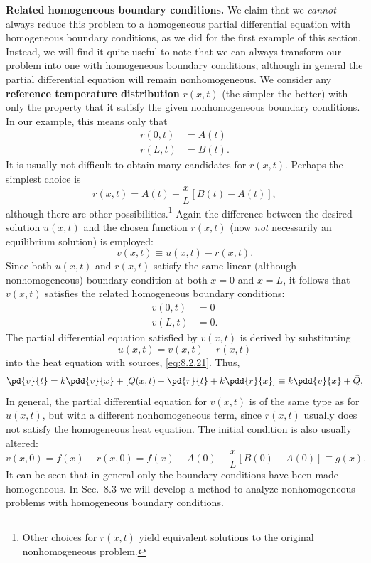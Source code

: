 \textbf{Related homogeneous boundary conditions.}
We claim that we \emph{cannot} always reduce this problem to a homogeneous partial differential equation with homogeneous boundary conditions, as we did for the first example of this section.  Instead, we will find it quite useful to note that we can always transform our problem into one with homogeneous boundary conditions, although in general the partial differential equation will remain nonhomogeneous.  We consider any \textbf{reference temperature distribution} $r(x,t)$ (the simpler the better) with only the property that it satisfy the given nonhomogeneous boundary conditions.  In our example, this means only that
\begin{align*}
r(0,t) &= A(t) \\
r(L,t) &= B(t).
\end{align*}
It is usually not difficult to obtain many candidates for $r(x,t)$.  Perhaps the simplest choice is
\begin{equation}
\label{eq:8.2.24}
r(x,t) = A(t) + \frac{x}{L}[B(t)-A(t)],
\end{equation}
although there are other possibilities.\footnote{Other choices for $r(x,t)$ yield equivalent solutions to the original nonhomogeneous problem.}
Again the difference between the desired solution $u(x,t)$ and the chosen function $r(x,t)$ (now \emph{not} necessarily an equilibrium solution) is employed:
\begin{equation}
\label{eq:8.2.25}
v(x,t) \equiv u(x,t) - r(x,t).
\end{equation}
Since both $u(x,t)$ and $r(x,t)$ satisfy the same linear (although nonhomogeneous) boundary condition at both $x=0$ and $x=L$, it follows that $v(x,t)$ satisfies the related homogeneous boundary conditions:
\begin{align}
\label{eq:8.2.26}
v(0,t) &= 0 \\
\label{eq:8.2.27}
v(L,t) &= 0.
\end{align}
The partial differential equation satisfied by $v(x,t)$ is derived by substituting
\[
u(x,t) = v(x,t) + r(x,t)
\]
into the heat equation with sources, \eqref{eq:8.2.21}.  Thus,
\begin{equation}
\label{eq:8.2.28}
\pd{v}{t} = k\pdd{v}{x} + \left[Q(x,t) - \pd{r}{t} + k\pdd{r}{x}\right] \equiv k\pdd{v}{x} + \bar{Q},
\end{equation}
In general, the partial differential equation for $v(x,t)$ is of the same type as for $u(x,t)$, but with a different nonhomogeneous term, since $r(x,t)$ usually does not satisfy the homogeneous heat equation.  The initial condition is also usually altered:
\begin{equation}
\label{eq:8.2.29}
v(x,0) = f(x) - r(x,0) = f(x) - A(0) - \frac{x}{L}[B(0)-A(0)] \equiv g(x).
\end{equation}
It can be seen that in general only the boundary conditions have been made homogeneous.  In Sec.~8.3 we will develop a method to analyze nonhomogeneous problems with homogeneous boundary conditions.

